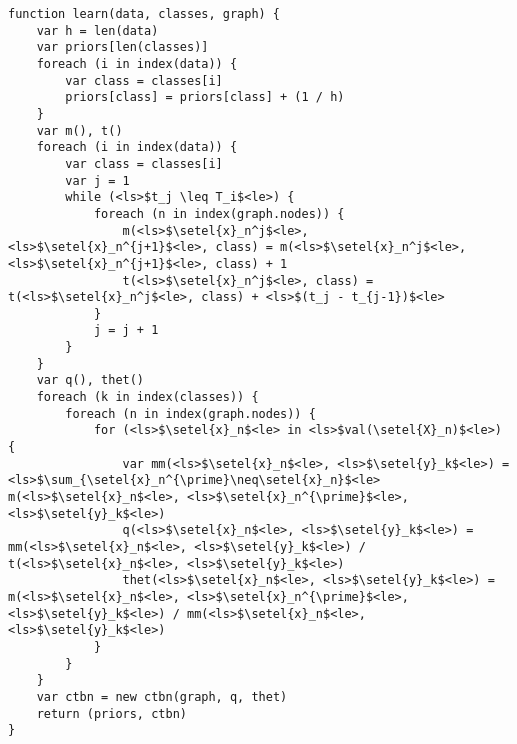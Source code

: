 \begin{lstlisting}[caption=Apprendimento di un classificatore \acs{CTNB}, label=lst:ctnbc-learning]
function learn(data, classes, graph) {
    var h = len(data)
    var priors[len(classes)]
    foreach (i in index(data)) {
        var class = classes[i]
        priors[class] = priors[class] + (1 / h)
    }
    var m(), t()
    foreach (i in index(data)) {
        var class = classes[i]
        var j = 1
        while (<ls>$t_j \leq T_i$<le>) {
            foreach (n in index(graph.nodes)) {
                m(<ls>$\setel{x}_n^j$<le>, <ls>$\setel{x}_n^{j+1}$<le>, class) = m(<ls>$\setel{x}_n^j$<le>, <ls>$\setel{x}_n^{j+1}$<le>, class) + 1
                t(<ls>$\setel{x}_n^j$<le>, class) = t(<ls>$\setel{x}_n^j$<le>, class) + <ls>$(t_j - t_{j-1})$<le>
            }
            j = j + 1
        }
    }
    var q(), thet()
    foreach (k in index(classes)) {
        foreach (n in index(graph.nodes)) {
            for (<ls>$\setel{x}_n$<le> in <ls>$val(\setel{X}_n)$<le>) {
                var mm(<ls>$\setel{x}_n$<le>, <ls>$\setel{y}_k$<le>) = <ls>$\sum_{\setel{x}_n^{\prime}\neq\setel{x}_n}$<le> m(<ls>$\setel{x}_n$<le>, <ls>$\setel{x}_n^{\prime}$<le>, <ls>$\setel{y}_k$<le>)
                q(<ls>$\setel{x}_n$<le>, <ls>$\setel{y}_k$<le>) = mm(<ls>$\setel{x}_n$<le>, <ls>$\setel{y}_k$<le>) / t(<ls>$\setel{x}_n$<le>, <ls>$\setel{y}_k$<le>)
                thet(<ls>$\setel{x}_n$<le>, <ls>$\setel{y}_k$<le>) = m(<ls>$\setel{x}_n$<le>, <ls>$\setel{x}_n^{\prime}$<le>, <ls>$\setel{y}_k$<le>) / mm(<ls>$\setel{x}_n$<le>, <ls>$\setel{y}_k$<le>)
            }
        }
    }
    var ctbn = new ctbn(graph, q, thet)
    return (priors, ctbn)
}
\end{lstlisting}

